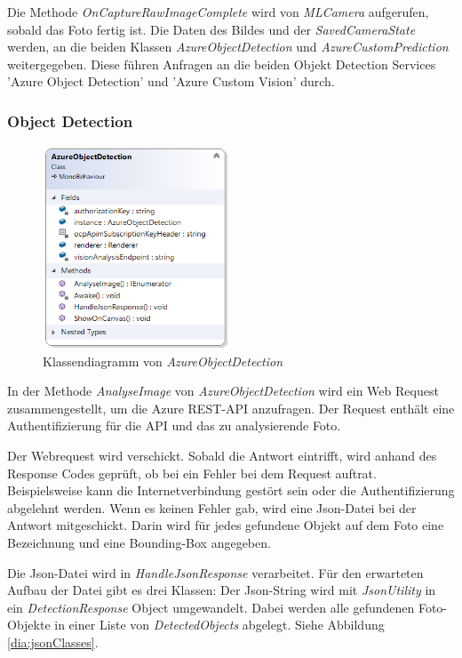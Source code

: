 Die Methode \textit{OnCaptureRawImageComplete} wird von \textit{MLCamera} aufgerufen, sobald das Foto fertig ist. Die Daten des Bildes und der \textit{SavedCameraState} werden, an die beiden Klassen \textit{AzureObjectDetection} und \textit{AzureCustomPrediction} weitergegeben. Diese führen Anfragen an die beiden Objekt Detection Services 'Azure Object Detection' und 'Azure Custom Vision' durch.

\subsubsection{Object Detection}

\begin{figure}[H]
	\centering
	\includegraphics[width=0.5\textwidth]{images/dia_azureobjectdetection.PNG}
	\caption[Klassendiagramm von \textit{AzureObjectDetection}]{Klassendiagramm von \textit{AzureObjectDetection}}
	\label{dia:azureobjectdetection}
\end{figure}

In der Methode \textit{AnalyseImage} von \textit{AzureObjectDetection} wird ein Web Request zusammengestellt, um die Azure REST-API anzufragen. Der Request enthält eine Authentifizierung für die API und das zu analysierende Foto. %

Der Webrequest wird verschickt. Sobald die Antwort eintrifft, wird anhand des Response Codes geprüft, ob bei ein Fehler bei dem Request auftrat. Beispielsweise kann die Internetverbindung gestört sein oder die Authentifizierung abgelehnt werden. Wenn es keinen Fehler gab, wird eine Json-Datei bei der Antwort mitgeschickt. Darin wird für jedes gefundene Objekt auf dem Foto eine Bezeichnung und eine Bounding-Box angegeben. 

Die Json-Datei wird in \textit{HandleJsonResponse} verarbeitet. Für den erwarteten Aufbau der Datei gibt es drei Klassen: Der Json-String wird mit \textit{JsonUtility} in ein \textit{DetectionResponse} Object umgewandelt. Dabei werden alle gefundenen Foto-Objekte in einer Liste von \textit{DetectedObjects} abgelegt. Siehe Abbildung \ref{dia:jsonClasses}. \citep{fromjson}

